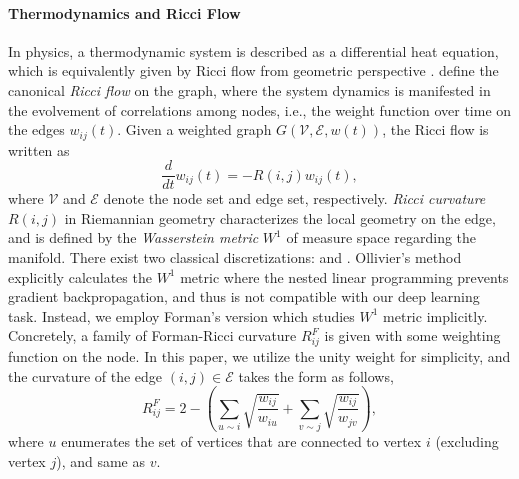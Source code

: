 \paragraph{Thermodynamics and Ricci Flow}
In physics, a thermodynamic system is described as a differential heat equation, 
which is equivalently given by Ricci flow from geometric perspective \cite{khan09introRicc}.
\citet{Bai20} define the canonical \emph{Ricci flow} on the graph, 
where the system dynamics is manifested in the evolvement of correlations among nodes, 
i.e., the weight function over time on the edges $w_{ij}(t)$. 
Given a weighted graph $G(\mathcal V, \mathcal E, w(t))$, the Ricci flow is written as 
\begin{equation}
    \frac{d}{dt}w_{ij}(t)=-R(i,j)w_{ij}(t),
    \label{RicciFlow}
\end{equation}
where $\mathcal V$ and $\mathcal E$ denote the node set and edge set, respectively.
\emph{Ricci curvature} $R(i,j)$ in Riemannian geometry characterizes the local geometry on the edge, 
and is defined by the \emph{Wasserstein metric} $W^1$ of measure space regarding the manifold.
There exist two classical discretizations: \citet{Ollivier2007} and \citet{Forman03}.
Ollivier’s  method explicitly calculates the $W^1$ metric where the nested linear programming prevents gradient backpropagation, and thus is not compatible with our deep learning task.
Instead, we employ Forman's version which studies $W^1$ metric implicitly.
Concretely, a family of Forman-Ricci curvature $R^F_{ij}$ is given with some weighting function on the node.
In this paper, we utilize the unity weight for simplicity, and the curvature of the edge $(i,j)\in\mathcal E$ takes the form as follows,
\begin{equation}
  R^F_{ij}=2-\left(\sum_{u\sim i}\sqrt{\frac{w_{ij}}{w_{iu}}}+\sum_{v\sim j}\sqrt{\frac{w_{ij}}{w_{jv}}}\right),
  \label{FormanCurvature}
\end{equation}
where $u$ enumerates the set of vertices that are connected to vertex $i$ (excluding vertex $j$), and same as $v$.


